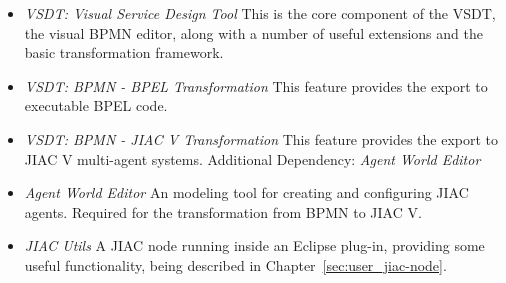 \begin{itemize}
	\item \emph{VSDT: Visual Service Design Tool} This is the core component of
	the VSDT, the visual BPMN editor, along with a number of useful extensions
	and the basic transformation framework.



	\item \emph{VSDT: BPMN - BPEL Transformation} This feature provides the export
	to executable BPEL code.

	\item \emph{VSDT: BPMN - JIAC V Transformation} This feature provides the
	export to JIAC V multi-agent systems.  Additional Dependency: \emph{Agent World
	Editor}


	\item \emph{Agent World Editor} An modeling tool for creating and configuring
	JIAC agents.  Required for the transformation from BPMN to JIAC V.

	\item \emph{JIAC Utils} A JIAC node running inside an Eclipse plug-in,
	providing some useful functionality, being described in
	Chapter~\ref{sec:user_jiac-node}.
\end{itemize}

